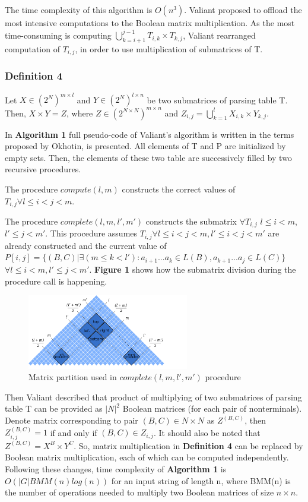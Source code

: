 \documentclass[runningheads]{llncs}
\begin{document}
The time complexity of this algorithm is $O(n^3)$. Valiant proposed to offload the most intensive computations to the Boolean matrix multiplication. As the most time-consuming is computing $\bigcup\limits_{k = i + 1}^{j - 1} T_{i, k} \times T_{k, j}$, Valiant rearranged computation of $T_{i, j}$, in order to use multiplication of submatrices of T. 

\subsubsection{Definition 4} Let $X \in (2^N)^{m \times l}$ and $Y \in (2^N)^{l \times n}$ be two submatrices of parsing table T. Then, $X \times Y = Z$, where $Z \in (2^{N \times N})^{m \times n}$ and $Z_{i, j} = \bigcup\limits_{k = 1}^{l} X_{i, k} \times Y_{k, j}$.

In \textbf{Algorithm 1} full pseudo-code of Valiant's algorithm is written in the terms proposed by Okhotin, is presented. All elements of T and P are initialized by empty sets. Then, the elements of these two table are successively filled by two recursive procedures.

The procedure $compute(l, m)$ constructs the correct values of $T_{i,j} \forall l \le i < j < m$.

The procedure $complete(l, m, l', m')$ constructs the submatrix $\forall T_{i, j}$ $l \le i < m$, $l' \le j < m'$. This procedure assumes $T_{i, j} \forall l \leq i < j < m,  l' \leq i < j < m'$ are already constructed and the current value of  $P[i, j] =  \{ (B, C) |\exists (m \le k < l'): a_{i + 1}...a_{k} \in L(B), a_{k + 1}...a_{j} \in L(C)\}$ $\forall l \leq i < m,  l' \leq j < m'$. \textbf{Figure 1} shows how the submatrix division during the procedure call is happening.

\begin{figure}[h]
\centering
\includegraphics[width=200pt]{splitting_with_grounded2.pdf}
\centering
\caption{Matrix partition used in $complete(l, m, l', m')$ procedure} \label{fig1}
\end{figure}

Then Valiant described that product of multiplying of two submatrices of parsing table T can be provided as $|N|^2$ Boolean matrices (for each pair of nonterminals). Denote matrix corresponding to pair $(B, C) \in N \times N$ as $Z^{(B, C)}$, then $Z_{i, j}^{(B, C)} = 1$ if and only if $(B, C) \in Z_{i, j}$. It should also be noted that $Z^{(B, C)} = X^{B} \times Y^{C}$. So, matrix multiplication in \textbf{Definition 4} can be replaced by Boolean matrix multiplication, each of which can be computed independently. Following these changes, time complexity of \textbf{Algorithm 1} is $O(|G|BMM(n)log(n))$ for an input string of length n, where BMM(n) is the number of operations needed to multiply two Boolean matrices of size $n \times n$.
\end{document}
